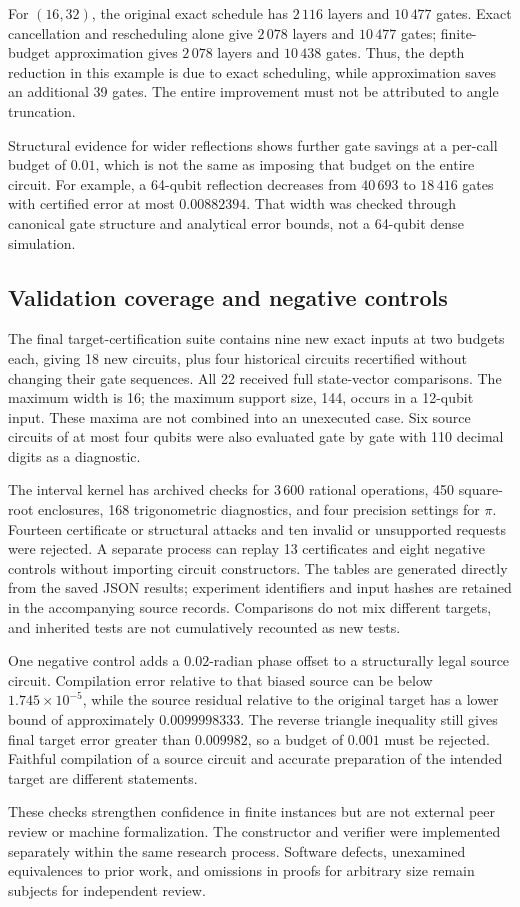 For $(16,32)$, the original exact schedule has $2\,116$ layers and $10\,477$ gates. Exact cancellation and rescheduling alone give $2\,078$ layers and $10\,477$ gates; finite-budget approximation gives $2\,078$ layers and $10\,438$ gates. Thus, the depth reduction in this example is due to exact scheduling, while approximation saves an additional 39 gates. The entire improvement must not be attributed to angle truncation.

Structural evidence for wider reflections shows further gate savings at a per-call budget of $0.01$, which is not the same as imposing that budget on the entire circuit. For example, a 64-qubit reflection decreases from $40\,693$ to $18\,416$ gates with certified error at most $0.00882394$. That width was checked through canonical gate structure and analytical error bounds, not a 64-qubit dense simulation.

\subsection{Validation coverage and negative controls}
The final target-certification suite contains nine new exact inputs at two budgets each, giving 18 new circuits, plus four historical circuits recertified without changing their gate sequences. All 22 received full state-vector comparisons. The maximum width is 16; the maximum support size, 144, occurs in a 12-qubit input. These maxima are not combined into an unexecuted case. Six source circuits of at most four qubits were also evaluated gate by gate with 110 decimal digits as a diagnostic.

The interval kernel has archived checks for 3\,600 rational operations, 450 square-root enclosures, 168 trigonometric diagnostics, and four precision settings for $\pi$. Fourteen certificate or structural attacks and ten invalid or unsupported requests were rejected. A separate process can replay 13 certificates and eight negative controls without importing circuit constructors. The tables are generated directly from the saved JSON results; experiment identifiers and input hashes are retained in the accompanying source records. Comparisons do not mix different targets, and inherited tests are not cumulatively recounted as new tests.

One negative control adds a $0.02$-radian phase offset to a structurally legal source circuit. Compilation error relative to that biased source can be below $1.745\times10^{-5}$, while the source residual relative to the original target has a lower bound of approximately $0.0099998333$. The reverse triangle inequality still gives final target error greater than $0.009982$, so a budget of $0.001$ must be rejected. Faithful compilation of a source circuit and accurate preparation of the intended target are different statements.

These checks strengthen confidence in finite instances but are not external peer review or machine formalization. The constructor and verifier were implemented separately within the same research process. Software defects, unexamined equivalences to prior work, and omissions in proofs for arbitrary size remain subjects for independent review.

